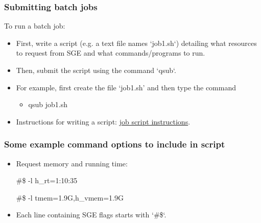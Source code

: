 \documentclass{beamer}
\begin{document}
\begin{frame}[fragile]
\frametitle{Submitting batch jobs}
To run a batch job:
\begin{itemize}
\item First, write a script (e.g.  a text file names `job1.sh`) detailing what resources to request from SGE and what commands/programs to run.
\item Then, submit the script using the command `qsub`.
\item For example, first create the file `job1.sh' and then type the command
\begin{itemize}
\item qsub job1.sh
\end{itemize}
\item Instructions for writing a script: \textcolor{blue}{\href{https://www.econ.ucl.ac.uk/wiki/index.php/Non-interactive_sessions}{job script instructions}}.
\end{itemize}
\end{frame}

\begin{frame}
\frametitle{Some example command options to include in script}
\begin{itemize}
\item Request memory and running time:
\begin{semiverbatim}
\#\$ -l h\_rt=1:10:35
\end{semiverbatim}
\vspace{-0.4cm}
\begin{semiverbatim}
\#\$ -l tmem=1.9G,h\_vmem=1.9G
\end{semiverbatim}
\item Each line containing SGE flags starts with `\#\$`.
\end{itemize}

\end{frame}
\end{document}
